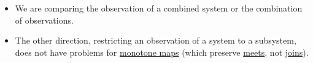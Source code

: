 \begin{itemize}
  \item  We are comparing the observation of a combined system or the combination of observations.
  \item The other direction, restricting an observation of a system to a subsystem, does not have problems for \href{doc/1 math/Seven Sketches in Compositionality/Chapter 1: Generative Effects/4 Monotone maps/1 Monotone map}{monotone maps} (which preserve \href{doc/1 math/Seven Sketches in Compositionality/Chapter 1: Generative Effects/5 Meets and joins/1 Definition and basic examples/Meet and join}{meets}, not \href{doc/1 math/Seven Sketches in Compositionality/Chapter 1: Generative Effects/5 Meets and joins/1 Definition and basic examples/Meet and join}{joins}).

\end{itemize}
